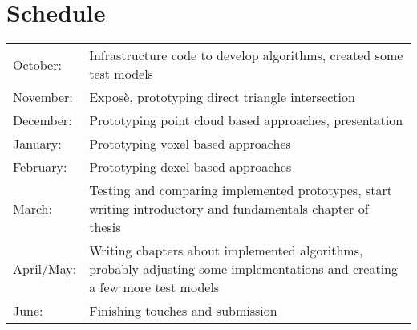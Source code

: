 
\section{Schedule}

\begin{tabularx}{\textwidth}{l X}
	October: & Infrastructure code to develop algorithms, created some test models \\
	
	November: & Expos\`e, prototyping direct triangle intersection \\
	
	December: & Prototyping point cloud based approaches, presentation \\
	
	January: & Prototyping voxel based approaches \\
	
	February: & Prototyping dexel based approaches \\
	
	March: & Testing and comparing implemented prototypes, start writing introductory and fundamentals chapter of thesis \\
	
	April/May: & Writing chapters about implemented algorithms, probably adjusting some implementations and creating a few more test models \\
	
	June: & Finishing touches and submission \\
\end{tabularx}

